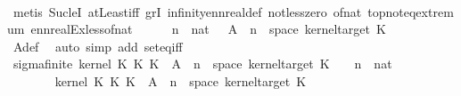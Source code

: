 \begin{isabellebody}
\ \ \ \ \ \ \isamarkupfalse%
\ {\isacharparenleft}{\kern0pt}metis\ Suc{\isacharunderscore}{\kern0pt}leI\ atLeast{\isacharunderscore}{\kern0pt}iff\ gr{}I\ infinity{\isacharunderscore}{\kern0pt}ennreal{\isacharunderscore}{\kern0pt}def\ not{\isacharunderscore}{\kern0pt}less{\isacharunderscore}{\kern0pt}zero\ of{\isacharunderscore}{\kern0pt}nat{\isacharunderscore}{\kern0pt}{}\ top{\isachardot}{\kern0pt}not{\isacharunderscore}{\kern0pt}eq{\isacharunderscore}{\kern0pt}extremum\ ennreal{\isacharunderscore}{\kern0pt}Ex{\isacharunderscore}{\kern0pt}less{\isacharunderscore}{\kern0pt}of{\isacharunderscore}{\kern0pt}nat{\isacharparenright}{\kern0pt}\isanewline
\ \ \ \ \isamarkupfalse%
\ {\isachardoublequoteopen}{\isacharparenleft}{\kern0pt}{\isasymUnion}n\ {\isacharcolon}{\kern0pt}{\isacharcolon}{\kern0pt}\ nat\ {\isasymin}\ {\isacharbraceleft}{\kern0pt}{}{\isachardot}{\kern0pt}{\isachardot}{\kern0pt}{\isacharbraceright}{\kern0pt}{\isachardot}{\kern0pt}\ A\ {\isasymomega}\ n{\isacharparenright}{\kern0pt}\ {\isacharequal}{\kern0pt}\ space\ {\isacharparenleft}{\kern0pt}kernel{\isacharunderscore}{\kern0pt}target\ K{\isacharunderscore}{\kern0pt}{}{\isacharparenright}{\kern0pt}{\isachardoublequoteclose}\isanewline
\ \ \ \ \ \ \isamarkupfalse%
\ A{\isacharunderscore}{\kern0pt}def\ \isamarkupfalse%
\ {\isacharparenleft}{\kern0pt}auto\ simp\ add{\isacharcolon}{\kern0pt}\ set{\isacharunderscore}{\kern0pt}eq{\isacharunderscore}{\kern0pt}iff\ {\isacharasterisk}{\kern0pt}\ {\isacharparenright}{\kern0pt}\isanewline
\ \ \ \ \isamarkupfalse%
\ sigma{\isacharunderscore}{\kern0pt}finite{\isacharcolon}{\kern0pt}\ {\isachardoublequoteopen}kernel\ {\isacharparenleft}{\kern0pt}K{\isacharunderscore}{\kern0pt}{}\ {\isasymOtimes}\isactrlsub K\ K{\isacharunderscore}{\kern0pt}{}{\isacharparenright}{\kern0pt}\ {\isasymomega}\ {\isacharparenleft}{\kern0pt}A\ {\isasymomega}\ n\ {\isasymtimes}\ space\ {\isacharparenleft}{\kern0pt}kernel{\isacharunderscore}{\kern0pt}target\ K{\isacharunderscore}{\kern0pt}{}{\isacharparenright}{\kern0pt}{\isacharparenright}{\kern0pt}\ {\isacharless}{\kern0pt}\ {\isasyminfinity}{\isachardoublequoteclose}\ \ n\ {\isacharcolon}{\kern0pt}{\isacharcolon}{\kern0pt}\ nat\isanewline
\ \ \ \ \isamarkupfalse%
\ {\isacharminus}{\kern0pt}\isanewline
\ \ \ \ \ \ \isamarkupfalse%
\ {\isachardoublequoteopen}kernel\ {\isacharparenleft}{\kern0pt}K{\isacharunderscore}{\kern0pt}{}\ {\isasymOtimes}\isactrlsub K\ K{\isacharunderscore}{\kern0pt}{}{\isacharparenright}{\kern0pt}\ {\isasymomega}\ {\isacharparenleft}{\kern0pt}A\ {\isasymomega}\ n\ {\isasymtimes}\ space\ {\isacharparenleft}{\kern0pt}kernel{\isacharunderscore}{\kern0pt}target\ K{\isacharunderscore}{\kern0pt}{}{\isacharparenright}{\kern0pt}{\isacharparenright}{\kern0pt}\ {\isacharequal}{\kern0pt}\ \isanewline

\end{isabellebody}
